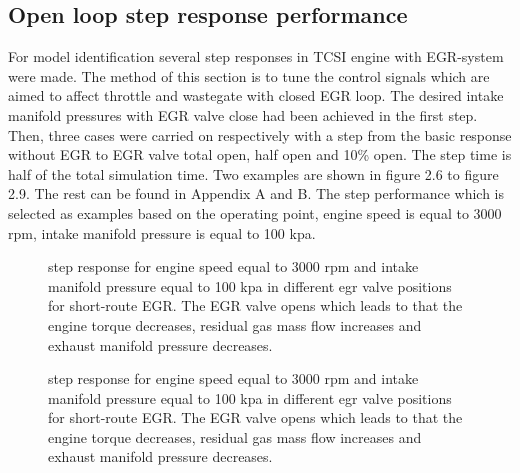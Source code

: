 \subsection{Open loop step response performance}
For model identification several step responses in TCSI engine with EGR-system were made. The method of this section is to tune the control signals which are aimed to affect throttle and wastegate with closed EGR loop. The desired intake manifold pressures with EGR valve close had been achieved in the first step. Then, three cases were carried on respectively with a step  from the basic response without EGR to EGR valve total open, half open and 10\% open. The step time is half of the total simulation time. Two examples are shown in figure 2.6 to figure 2.9. The rest can be found in Appendix A and B. The step performance which is selected as examples based on the operating point, engine speed is equal to 3000 rpm, intake manifold pressure is equal to 100 kpa. 

\begin{figure}[tbp]
  \centering
  \qquad
  \caption{\label{fig:step_response_short_3000_100_1}%
    step response for engine speed equal to 3000 rpm and intake manifold pressure equal to 100 kpa in different egr valve positions for short-route EGR. The EGR valve opens which leads to that the engine torque decreases, residual gas mass flow increases and exhaust manifold pressure decreases.}
\end{figure}

\begin{figure}[tbp]
  \centering
  \qquad
  \caption{\label{fig:step_response_short_3000_100_2}%
    step response for engine speed equal to 3000 rpm and intake manifold pressure equal to 100 kpa in different egr valve positions for short-route EGR. The EGR valve opens which leads to that the engine torque decreases, residual gas mass flow increases and exhaust manifold pressure decreases.}
\end{figure}

